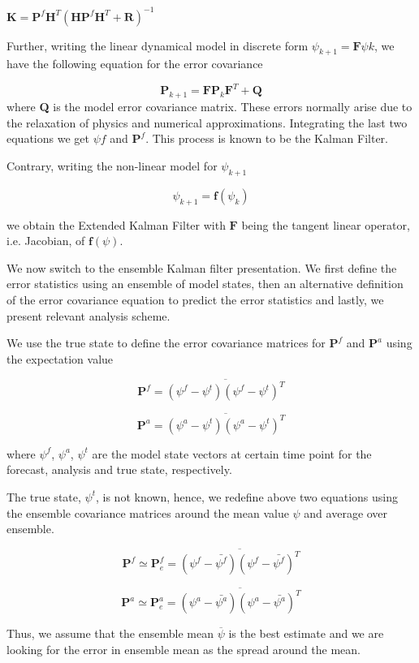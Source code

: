 \documentclass[a4,12pt]{article}
\begin{document}
$\textbf{K} = \textbf{P}^{f}\textbf{H}^{T}(\textbf{H}\textbf{P}^{f}\textbf{H}^{T}+\textbf{R})^{-1}$

Further, writing the linear dynamical model in discrete form $\psi_{k+1}=\textbf{F}\psi{k}$, we have the following equation for the error covariance

$$\textbf{P}_{k+1}=\textbf{F}\textbf{P}_{k}\textbf{F}^{T}+\textbf{Q}$$
where \textbf{Q} is the model error covariance matrix. These errors normally arise due to the relaxation of physics and numerical approximations. Integrating the last two equations we get $\psi{f}$ and $\textbf{P}^{f}$. This process is known to be the Kalman Filter.

Contrary, writing the non-linear model for $\psi_{k+1}$

$$\psi_{k+1}=\textbf{f}(\psi_{k})$$

we obtain the Extended Kalman Filter with $\textbf{F}$ being the tangent linear operator, i.e. Jacobian, of $\textbf{f}(\psi)$.

We now switch to the ensemble Kalman filter presentation. We first define the error statistics using an ensemble of model states, then an alternative definition of the error covariance equation to predict the error statistics and lastly, we present relevant analysis scheme.

We use the true state to define the error covariance matrices for $\textbf{P}^{f}$ and $\textbf{P}^{a}$ using the expectation value 

$$\textbf{P}^{f} = \overline{(\psi^{f}-\psi^{t})(\psi^{f}-\psi^{t})^{T}}$$

$$\textbf{P}^{a} = \overline{(\psi^{a}-\psi^{t})(\psi^{a}-\psi^{t})^{T}}$$

where $\psi ^{f}$, $\psi ^{a}$, $\psi ^{t}$ are the model state vectors at certain time point for the forecast, analysis and true state, respectively.

The true state, $\psi ^{t}$, is not known, hence, we redefine above two equations using the ensemble covariance matrices around the mean value $\psi$ and average over ensemble. 

$$\textbf{P}^{f} \simeq \textbf{P}^{f}_{e} = \overline{(\psi^{f}-\bar{\psi^{f}})(\psi^{f}-\bar{\psi^{f}})^{T}}$$

$$\textbf{P}^{a} \simeq \textbf{P}^{a}_{e}= \overline{ (\psi^{a}-\bar {\psi^{a}})(\psi^{a}-\bar{\psi^{a}})^{T} }$$

Thus, we assume that the ensemble mean $\overline {\psi}$ is the best estimate  and we are looking for the error in ensemble mean as the spread around the mean.
\end{document}
